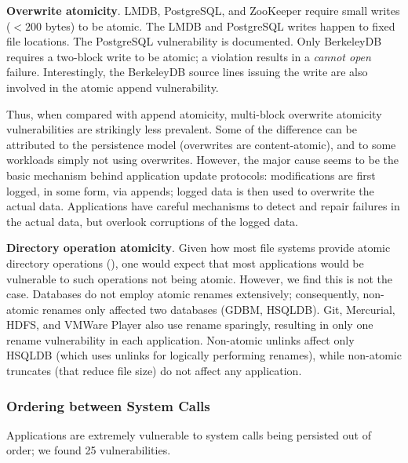 \textbf{Overwrite atomicity}. LMDB, PostgreSQL, and ZooKeeper require small
writes ($<200$ bytes) to be atomic. The LMDB and PostgreSQL writes happen to
fixed file locations. The PostgreSQL vulnerability is documented. Only
BerkeleyDB requires a two-block write to be atomic; a violation
results in a \textit{cannot open} failure. Interestingly, the BerkeleyDB source
lines issuing the write are also involved in the atomic append vulnerability.

Thus, when compared with append atomicity, multi-block overwrite atomicity
vulnerabilities are strikingly less prevalent. Some of the difference can be
attributed to the persistence model (overwrites are content-atomic), and to some
workloads simply not using overwrites. However, the major cause seems to be the
basic mechanism behind application update protocols: modifications are first
logged, in some form, via appends; logged data is then used to overwrite the
actual data. Applications have careful mechanisms to detect and repair failures
in the actual data, but overlook corruptions of the logged data.

\textbf{Directory operation atomicity}. Given how most file systems provide
atomic directory operations (), one would expect that
most applications would be vulnerable to such operations not being atomic.
However, we find this is not the case. Databases do not employ atomic renames
extensively; consequently, non-atomic renames only affected two databases (GDBM,
HSQLDB). Git, Mercurial, HDFS, and VMWare Player also use rename sparingly, resulting
in only one rename vulnerability in each application. Non-atomic unlinks 
affect only HSQLDB (which uses unlinks for logically performing renames),
while non-atomic truncates (that reduce file size) do not affect any application.


\subsubsection{Ordering between System Calls} 
Applications are extremely vulnerable to system calls being persisted out of
order; we found 25 vulnerabilities. 


